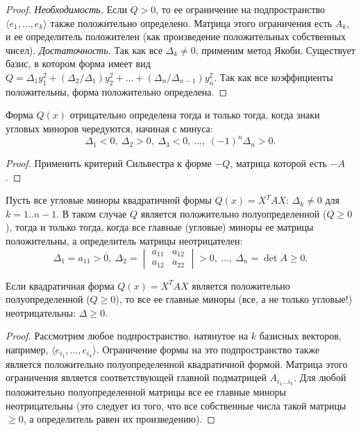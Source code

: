 \documentclass[12pt]{article}
\begin{document}
\begin{proof}
\textit{Необходимость.} Если $Q>0$, то ее ограничение на подпространство $\langle e_1,\dots,e_k\rangle$ также положительно определено. Матрица этого ограничения есть $A_k$, и ее определитель положителен (как произведение положительных собственных чисел).
\textit{Достаточность.} Так как все $\Delta_k \neq 0$, применим метод Якоби. Существует базис, в котором форма имеет вид $Q = \Delta_1 y_1^2 + (\Delta_2/\Delta_1) y_2^2 + \dots + (\Delta_n/\Delta_{n-1}) y_n^2$. Так как все коэффициенты положительны, форма положительно определена.
\end{proof}

\begin{theorem}
Форма $Q(x)$ отрицательно определена тогда и только тогда, когда знаки угловых миноров чередуются, начиная с минуса:
\[
\Delta_1 < 0,\ \Delta_2 > 0,\ \Delta_3 < 0,\ \dots,\ (-1)^n \Delta_n > 0.
\]
\end{theorem}
\begin{proof}
Применить критерий Сильвестра к форме $-Q$, матрица которой есть $-A$.
\end{proof}

\begin{corollary}
Пусть все угловые миноры квадратичной формы $Q(x) = X^T A X$: $\Delta_k \neq 0$ для $k=1..n-1$. В таком случае $Q$ является положительно полуопределенной ($Q \ge 0$), тогда и только тогда, когда все главные (угловые) миноры ее матрицы положительны, а определитель матрицы неотрицателен:
\[
\Delta_1 = a_{11} > 0,\ \Delta_2 = \begin{vmatrix} a_{11} & a_{12} \\ a_{12} & a_{22} \end{vmatrix} > 0,\ \dots,\ \Delta_n = \det A \geq 0.
\]
\end{corollary}

\begin{theorem}
Если квадратичная форма $Q(x) = X^T A X$ является положительно полуопределенной ($Q \ge 0$), то все ее главные миноры (все, а не только угловые!) неотрицательны: $\Delta \ge 0$.
\end{theorem}

\begin{proof}
Рассмотрим любое подпространство, натянутое на $k$ базисных векторов, например, $\langle e_{i_1}, \dots, e_{i_k} \rangle$. Ограничение формы на это подпространство также является положительно полуопределенной квадратичной формой. Матрица этого ограничения является соответствующей главной подматрицей $A_{i_1 \dots i_k}$. Для любой положительно полуопределенной матрицы все ее главные миноры неотрицательны (это следует из того, что все собственные числа такой матрицы $\ge 0$, а определитель равен их произведению).
\end{proof}
\end{document}
